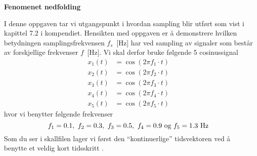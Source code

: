\item
  {\bf Fenomenet nedfolding}

\label{oppg:h}

  I denne oppgaven tar vi utgangspunkt i hvordan sampling blir utført
  som vist i kapittel 7.2 i kompendiet. 
  Hensikten med oppgaven er å demonstrere hvilken betydningen
  samplingsfrekvensen  $f_{s}$~[Hz] har ved sampling av signaler som
  består av forskjellige frekvenser $f$~[Hz].  Vi skal derfor bruke
  følgende 5 cosinussignal
\begin{align}
  x_{1}(t) & =   \cos(2\pi f_{1} {\cdot}t)  \label{eq:U1} \\
  x_{2}(t) & =   \cos(2 \pi f_{2} {\cdot}t)  \label{eq:U2} \\
  x_{3}(t) & =   \cos(2\pi f_{3} {\cdot}t)  \label{eq:U3}\\
  x_{4}(t) & =   \cos(2\pi f_{4} {\cdot}t)  \label{eq:U4}\\
  x_{5}(t) & =   \cos(2\pi f_{5} {\cdot}t)  \label{eq:U5}
\end{align}
  hvor vi benytter følgende frekvenser 
\begin{equation}
  f_{1} = 0.1,  ~ f_{2}= 0.3, ~ f_{3}= 0.5, ~ f_{4}= 0.9 ~\text{og}~f_{5}= 1.3
  ~\text{Hz} \notag
\end{equation}
Som du ser i skallfilen lager vi først 
den ``kontinuerlige'' tidsvektoren   ved å benytte et
veldig kort tidsskritt .

